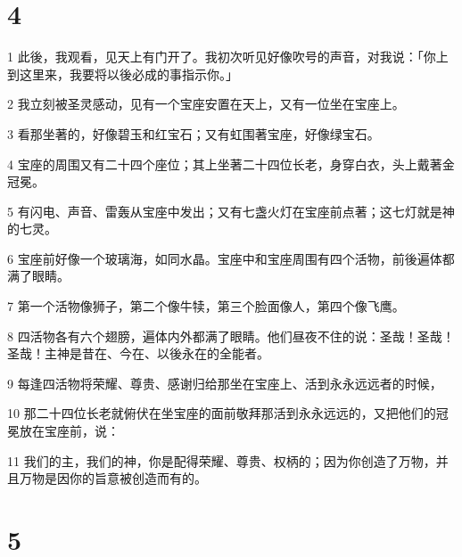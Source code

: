 \chapter{4}

\par 1 此後，我观看，见天上有门开了。我初次听见好像吹号的声音，对我说：「你上到这里来，我要将以後必成的事指示你。」
\par 2 我立刻被圣灵感动，见有一个宝座安置在天上，又有一位坐在宝座上。
\par 3 看那坐著的，好像碧玉和红宝石；又有虹围著宝座，好像绿宝石。
\par 4 宝座的周围又有二十四个座位；其上坐著二十四位长老，身穿白衣，头上戴著金冠冕。
\par 5 有闪电、声音、雷轰从宝座中发出；又有七盏火灯在宝座前点著；这七灯就是神的七灵。
\par 6 宝座前好像一个玻璃海，如同水晶。宝座中和宝座周围有四个活物，前後遍体都满了眼睛。
\par 7 第一个活物像狮子，第二个像牛犊，第三个脸面像人，第四个像飞鹰。
\par 8 四活物各有六个翅膀，遍体内外都满了眼睛。他们昼夜不住的说：圣哉！圣哉！圣哉！主神是昔在、今在、以後永在的全能者。
\par 9 每逢四活物将荣耀、尊贵、感谢归给那坐在宝座上、活到永永远远者的时候，
\par 10 那二十四位长老就俯伏在坐宝座的面前敬拜那活到永永远远的，又把他们的冠冕放在宝座前，说：
\par 11 我们的主，我们的神，你是配得荣耀、尊贵、权柄的；因为你创造了万物，并且万物是因你的旨意被创造而有的。

\chapter{5}

